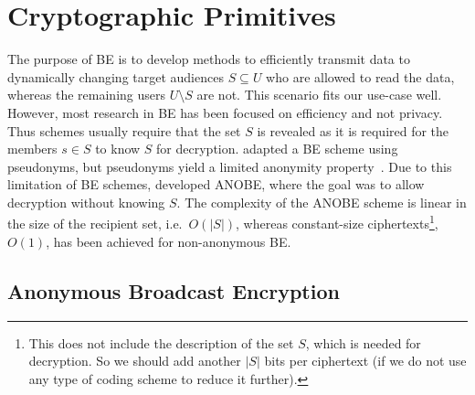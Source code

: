 \section<article>{Cryptographic Primitives}\label{BE}\label{Prerequisites}

The purpose of \ac{BE} is to develop methods to efficiently transmit data to 
dynamically changing target audiences \(S\subseteq U\) who are allowed to read 
the data, whereas the remaining users \(U\setminus S\) are not.
This scenario fits our use-case well.
However, most research in \ac{BE} has been focused on efficiency and not 
privacy.
Thus schemes usually require that the set \(S\) is revealed as it is required 
for the members \(s\in S\) to know \(S\) for decryption.
\citet{PseudonymousBE} adapted a \ac{BE} scheme using pseudonyms, but 
pseudonyms yield a limited anonymity property~\cite{PseudonymousBE}.
Due to this limitation of \ac{BE} schemes, \citet{ANOBE} developed \ac{ANOBE}, 
where the goal was to allow decryption without knowing \(S\).
The complexity of the \ac{ANOBE} scheme is linear in the size of the recipient 
set, i.e.~\(O(|S|)\), whereas constant-size ciphertexts\footnote{%
  This does not include the description of the set \(S\), which is needed for 
  decryption.
  So we should add another \(|S|\) bits per ciphertext (if we do not use any 
  type of coding scheme to reduce it further).
}, \(O(1)\), has been achieved for non-anonymous \ac{BE}.

\subsection{Anonymous Broadcast Encryption}\label{ANOBE}


